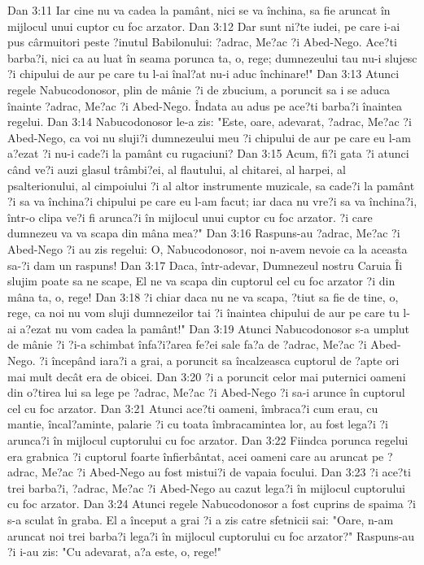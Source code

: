 Dan 3:11  Iar cine nu va cadea la pamânt, nici se va închina, sa fie aruncat în mijlocul unui cuptor cu foc arzator.
Dan 3:12  Dar sunt ni?te iudei, pe care i-ai pus cârmuitori peste ?inutul Babilonului: ?adrac, Me?ac ?i Abed-Nego. Ace?ti barba?i, nici ca au luat în seama porunca ta, o, rege; dumnezeului tau nu-i slujesc ?i chipului de aur pe care tu l-ai înal?at nu-i aduc închinare!"
Dan 3:13  Atunci regele Nabucodonosor, plin de mânie ?i de zbucium, a poruncit sa i se aduca înainte ?adrac, Me?ac ?i Abed-Nego. Îndata au adus pe ace?ti barba?i înaintea regelui.
Dan 3:14  Nabucodonosor le-a zis: "Este, oare, adevarat, ?adrac, Me?ac ?i Abed-Nego, ca voi nu sluji?i dumnezeului meu ?i chipului de aur pe care eu l-am a?ezat ?i nu-i cade?i la pamânt cu rugaciuni?
Dan 3:15  Acum, fi?i gata ?i atunci când ve?i auzi glasul trâmbi?ei, al flautului, al chitarei, al harpei, al psalterionului, al cimpoiului ?i al altor instrumente muzicale, sa cade?i la pamânt ?i sa va închina?i chipului pe care eu l-am facut; iar daca nu vre?i sa va închina?i, într-o clipa ve?i fi arunca?i în mijlocul unui cuptor cu foc arzator. ?i care dumnezeu va va scapa din mâna mea?"
Dan 3:16  Raspuns-au ?adrac, Me?ac ?i Abed-Nego ?i au zis regelui: O, Nabucodonosor, noi n-avem nevoie ca la aceasta sa-?i dam un raspuns!
Dan 3:17  Daca, într-adevar, Dumnezeul nostru Caruia Îi slujim poate sa ne scape, El ne va scapa din cuptorul cel cu foc arzator ?i din mâna ta, o, rege!
Dan 3:18  ?i chiar daca nu ne va scapa, ?tiut sa fie de tine, o, rege, ca noi nu vom sluji dumnezeilor tai ?i înaintea chipului de aur pe care tu l-ai a?ezat nu vom cadea la pamânt!"
Dan 3:19  Atunci Nabucodonosor s-a umplut de mânie ?i ?i-a schimbat înfa?i?area fe?ei sale fa?a de ?adrac, Me?ac ?i Abed-Nego. ?i începând iara?i a grai, a poruncit sa încalzeasca cuptorul de ?apte ori mai mult decât era de obicei.
Dan 3:20  ?i a poruncit celor mai puternici oameni din o?tirea lui sa lege pe ?adrac, Me?ac ?i Abed-Nego ?i sa-i arunce în cuptorul cel cu foc arzator.
Dan 3:21  Atunci ace?ti oameni, îmbraca?i cum erau, cu mantie, încal?aminte, palarie ?i cu toata îmbracamintea lor, au fost lega?i ?i arunca?i în mijlocul cuptorului cu foc arzator.
Dan 3:22  Fiindca porunca regelui era grabnica ?i cuptorul foarte înfierbântat, acei oameni care au aruncat pe ?adrac, Me?ac ?i Abed-Nego au fost mistui?i de vapaia focului.
Dan 3:23  ?i ace?ti trei barba?i, ?adrac, Me?ac ?i Abed-Nego au cazut lega?i în mijlocul cuptorului cu foc arzator.
Dan 3:24  Atunci regele Nabucodonosor a fost cuprins de spaima ?i s-a sculat în graba. El a început a grai ?i a zis catre sfetnicii sai: "Oare, n-am aruncat noi trei barba?i lega?i în mijlocul cuptorului cu foc arzator?" Raspuns-au ?i i-au zis: "Cu adevarat, a?a este, o, rege!"
